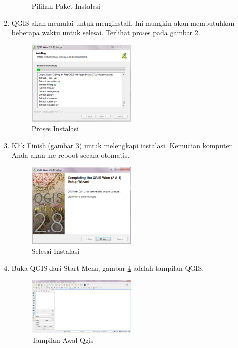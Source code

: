\begin{enumerate}
\begin{figure}[ht]
        \caption{Pilihan Paket Instalasi}
        \label{image9}
        \end{figure}
\item
QGIS akan memulai untuk menginstall. Ini mungkin akan membutuhkan beberapa waktu untuk selesai. Terlihat proses pada gambar \ref{image10}.
\begin{figure}[ht]
        \centerline{\includegraphics[width=0.5\textwidth]{figures/image10}}
        \caption{Proses Instalasi}
        \label{image10}
        \end{figure}
\item
Klik Finish (gambar \ref{image11}) untuk melengkapi instalasi. Kemudian komputer Anda akan me-reboot secara otomatis.
\begin{figure}[ht]
        \centerline{\includegraphics[width=0.5\textwidth]{figures/image11}}
        \caption{Selesai Instalasi}
        \label{image11}
        \end{figure}
\item
Buka QGIS dari Start Menu, gambar \ref{image12} adalah tampilan QGIS.
\begin{figure}[ht]
        \centerline{\includegraphics[width=0.5\textwidth]{figures/image12}}
        \caption{Tampilan Awal Qgis}
        \label{image12}
        \end{figure}
\end{enumerate}

